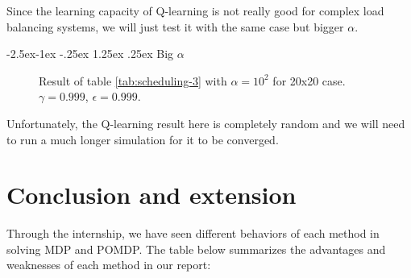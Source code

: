 \documentclass[
  a4paper, xcolor = usenames,dvipsnames]{article}
\makeatletter
\renewcommand\paragraph{\@startsection{paragraph}{4}{\z@}%
  {-2.5ex\@plus -1ex \@minus -.25ex}%
  {1.25ex \@plus .25ex}%
  {\normalfont\normalsize\bfseries}}
\theoremstyle{definition}
\theoremstyle{definition}
\theoremstyle{definition}
\theoremstyle{definition}
\theoremstyle{remark}
\makeatother
\begin{document}
Since the learning capacity of Q-learning is not really good for complex load balancing systems, we will just test it with the same case but bigger \(\alpha\).

\hypertarget{big-alpha-1}{%
\paragraph{\texorpdfstring{Big \(\alpha\)}{Big \textbackslash alpha}}\label{big-alpha-1}}



\begin{figure}

{\centering {}

}

\caption{Result of table \ref{tab:scheduling-3} with \(\alpha = 10^{2}\) for 20x20 case. \(\gamma = 0.999\), \(\epsilon = 0.999\).}\label{fig:20x20-lb-2}
\end{figure}

Unfortunately, the Q-learning result here is completely random and we will need to run a much longer simulation for it to be converged.

\hypertarget{conclusion-and-extension}{%
\section{Conclusion and extension}\label{conclusion-and-extension}}

Through the internship, we have seen different behaviors of each method in solving MDP and POMDP. The table below summarizes the advantages and weaknesses of each method in our report:
\end{document}
